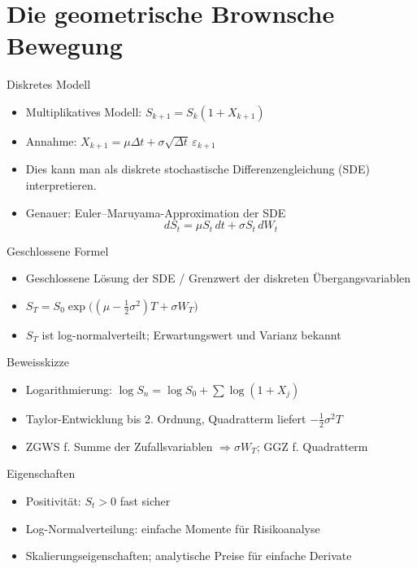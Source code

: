 \documentclass{beamer}
\begin{document}
\section{Die geometrische Brownsche Bewegung}

\begin{frame}{Diskretes Modell}
  \begin{itemize}
      \item Multiplikatives Modell: $S_{k+1}=S_k(1+X_{k+1})$
      \item Annahme: $X_{k+1}=\mu\Delta t+\sigma\sqrt{\Delta t}\,\varepsilon_{k+1}$
      \item Dies kann man als diskrete stochastische Differenzengleichung (SDE) interpretieren.
      \item Genauer: Euler--Maruyama-Approximation der SDE $$dS_t = \mu S_t\,dt + \sigma S_t\,dW_t$$
  \end{itemize}
\end{frame}

\begin{frame}{Geschlossene Formel}
  \begin{itemize}
      \item Geschlossene Lösung der SDE / Grenzwert der diskreten Übergangsvariablen
      \item $S_T = S_0 \exp\big((\mu-\tfrac12\sigma^2)T + \sigma W_T\big)$
      \item $S_T$ ist log-normalverteilt; Erwartungswert und Varianz bekannt
  \end{itemize}
\end{frame}

\begin{frame}{Beweisskizze}
  \begin{itemize}
      \item Logarithmierung: $\log S_n = \log S_0 + \sum \log(1+X_j)$
      \item Taylor-Entwicklung bis 2. Ordnung, Quadratterm liefert $-\tfrac12\sigma^2T$
      \item ZGWS f. Summe der Zufallsvariablen $\Rightarrow \sigma W_T$; GGZ f. Quadratterm
  \end{itemize}
\end{frame}

\begin{frame}{Eigenschaften}
  \begin{itemize}
      \item Positivität: $S_t>0$ fast sicher
      \item Log-Normalverteilung: einfache Momente für Risikoanalyse
      \item Skalierungseigenschaften; analytische Preise für einfache Derivate
  \end{itemize}
\end{frame}
\end{document}
